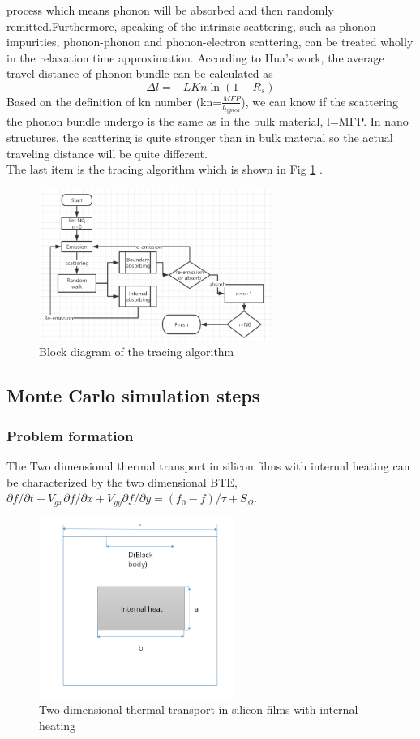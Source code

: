 process which means phonon will be absorbed and then randomly remitted.Furthermore, speaking of the intrinsic scattering, such as phonon-impurities, phonon-phonon and phonon-electron scattering, can be treated wholly in the relaxation time approximation. According to Hua's work\cite{Acta}, the average travel distance of phonon bundle can be calculated as
\begin{equation} \label{eq 7}
\Delta l=-L Kn \ln{ (1-R_{s})}
\end{equation}
Based on the definition of kn number (kn=$\frac{MFP}{l_{typica}}$), we can know if the scattering the phonon bundle undergo is the same as in the bulk material, l=MFP. In nano structures, the scattering is quite stronger than in bulk material so the actual traveling distance will be quite different.\\
\indent The last item  is the tracing algorithm which is shown in Fig \ref{fig:1} .
\begin{figure}[!hbt]
  \centering
  \includegraphics[width=3in]{1.png}
  \caption{Block diagram of the tracing algorithm}
  \label{fig:1}  
\end{figure}


\subsection{Monte Carlo simulation steps}
\subsubsection{Problem formation}
The Two dimensional thermal transport in silicon films with internal heating can be characterized by the two dimensional BTE, $\partial f / \partial t + V_{gx}\partial f / \partial x + V_{gy}\partial f / \partial y = (f_0 - f)/ \tau + \dot{S}_{\Omega}$. 


\begin{figure}[!hbt]
  \centering
  \includegraphics[width=2.5in]{5.png}
  \caption{Two dimensional thermal transport in silicon films with internal heating}
  \label{fig:2}  
\end{figure}

